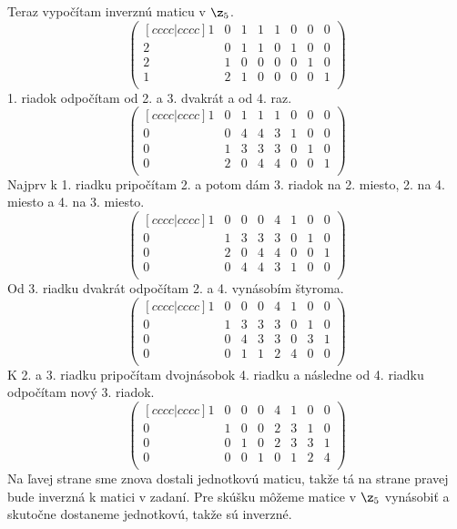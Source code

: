 \bigskip
Teraz vypočítam inverznú maticu v $\z_5$.
\[\begin{pmatrix}[cccc|cccc]
    1 & 0 & 1 & 1 & 1 & 0 & 0 & 0 \\
    2 & 0 & 1 & 1 & 0 & 1 & 0 & 0 \\
    2 & 1 & 0 & 0 & 0 & 0 & 1 & 0 \\
    1 & 2 & 1 & 0 & 0 & 0 & 0 & 1 \\
   \end{pmatrix}\]
1. riadok odpočítam od 2. a 3. dvakrát a od 4. raz.
\[\begin{pmatrix}[cccc|cccc]
    1 & 0 & 1 & 1 & 1 & 0 & 0 & 0 \\
    0 & 0 & 4 & 4 & 3 & 1 & 0 & 0 \\
    0 & 1 & 3 & 3 & 3 & 0 & 1 & 0 \\
    0 & 2 & 0 & 4 & 4 & 0 & 0 & 1 \\
   \end{pmatrix}\]
Najprv k 1. riadku pripočítam 2. a potom dám 3. riadok na 2. miesto, 
2. na 4. miesto a 4. na 3. miesto.
\[\begin{pmatrix}[cccc|cccc]
    1 & 0 & 0 & 0 & 4 & 1 & 0 & 0 \\
    0 & 1 & 3 & 3 & 3 & 0 & 1 & 0 \\
    0 & 2 & 0 & 4 & 4 & 0 & 0 & 1 \\
    0 & 0 & 4 & 4 & 3 & 1 & 0 & 0 \\
   \end{pmatrix}\]
Od 3. riadku dvakrát odpočítam 2. a 4. vynásobím štyroma.
\[\begin{pmatrix}[cccc|cccc]
    1 & 0 & 0 & 0 & 4 & 1 & 0 & 0 \\
    0 & 1 & 3 & 3 & 3 & 0 & 1 & 0 \\
    0 & 0 & 4 & 3 & 3 & 0 & 3 & 1 \\
    0 & 0 & 1 & 1 & 2 & 4 & 0 & 0 \\
   \end{pmatrix}\]
K 2. a 3. riadku pripočítam dvojnásobok 4. riadku a následne od 4. 
riadku odpočítam nový 3. riadok.
\[\begin{pmatrix}[cccc|cccc]
    1 & 0 & 0 & 0 & 4 & 1 & 0 & 0 \\
    0 & 1 & 0 & 0 & 2 & 3 & 1 & 0 \\
    0 & 0 & 1 & 0 & 2 & 3 & 3 & 1 \\
    0 & 0 & 0 & 1 & 0 & 1 & 2 & 4 \\
   \end{pmatrix}\]
Na ľavej strane sme znova dostali jednotkovú maticu, takže tá na strane 
pravej bude inverzná k matici v zadaní. Pre skúšku môžeme matice 
v $\z_5$ vynásobiť a skutočne dostaneme jednotkovú, takže sú inverzné.

